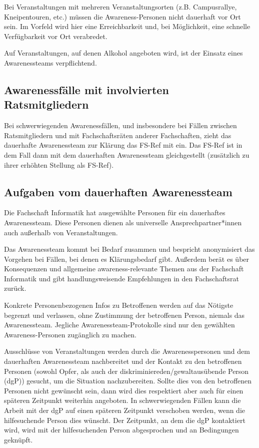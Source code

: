 \documentclass{article}
\begin{document}
Bei Veranstaltungen mit mehreren Veranstaltungsorten (z.B. Campusrallye, Kneipentouren, etc.) müs\-sen die Awareness-Personen nicht dauerhaft vor Ort sein. Im Vorfeld wird 
hier eine Erreichbarkeit und, bei Möglichkeit, eine schnelle Verfügbarkeit vor Ort verabredet.  

Auf Veranstaltungen, auf denen Alkohol angeboten wird, ist der Einsatz eines Awarenessteams verpflichtend.

\subsection{Awarenessfälle mit involvierten Ratsmitgliedern}
Bei schwerwiegenden Awarenessfällen, und insbesondere bei Fällen zwischen Ratsmitgliedern und mit Fachschaftsräten anderer Fachschaften, zieht das dauerhafte Awarenessteam zur 
Klärung das FS-Ref mit ein. Das FS-Ref ist in dem Fall dann mit dem dauerhaften Awarenessteam gleichgestellt (zusätzlich zu ihrer erhöhten Stellung als FS-Ref).

\subsection{Aufgaben vom dauerhaften Awarenessteam}
Die Fachschaft Informatik hat ausgewählte Personen für ein dauerhaftes Awarenessteam. Diese Personen dienen als universelle Ansprechpartner*innen auch außerhalb von 
Veranstaltungen.

Das Awarenessteam kommt bei Bedarf zusammen und bespricht anonymisiert das Vorgehen bei Fällen, bei denen es Klärungsbedarf gibt. 
Außerdem berät es über Konsequenzen und allgemeine awareness-relevante Themen aus der Fachschaft Informatik und gibt handlungsweisende Empfehlungen in den Fachschaftsrat zurück.  

Konkrete Personenbezogenen Infos zu Betroffenen werden auf das Nötigste begrenzt und verlassen, ohne Zustimmung der betroffenen Person, niemals das Awarenessteam. Jegliche 
Awarenessteam-Protokol\-le sind nur den gewählten Awareness-Personen zugänglich zu machen.

Ausschlüsse von Veranstaltungen werden durch die Awarenesspersonen und dem dauerhaften Awarenessteam nachbereitet und der Kontakt zu den betroffenen Personen (sowohl Opfer, als auch 
der diskriminiereden/gewaltausübende Person (dgP)) gesucht, um die Situation nachzubereiten. Sollte dies von den betroffenen Personen nicht gewünscht sein, dann wird dies 
respektiert aber auch für einen späteren Zeitpunkt weiterhin angeboten. In schwerwiegenden Fällen kann die Arbeit mit der dgP auf einen späteren Zeitpunkt verschoben werden,
wenn die hilfesuchende Person dies wünscht. Der Zeitpunkt, an dem die dgP kontaktiert wird, wird mit der hilfesuchenden Person abgesprochen und an Bedingungen geknüpft.
\end{document}
